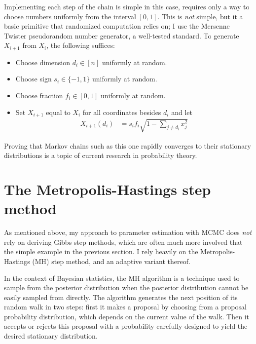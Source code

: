 Implementing each step of the chain is simple in this case, requires
only a way to choose numbers uniformly from the interval $[0,1]$.  This
is \emph{not} simple, but it a basic primitive that randomized
computation relies on; I use the Mersenne Twister pseudorandom number
generator, a well-tested standard.\cite{matsumoto_mersenne_1998}
To generate $X_{i+1}$ from $X_i$, the following suffices:
\begin{itemize}
\item Choose dimension $d_i \in [n]$ uniformly at random.
\item Choose sign $s_i \in \{-1, 1\}$ uniformly at random.
\item Choose fraction $f_i \in [0,1]$ uniformly at random.
\item Set $X_{i+1}$ equal to $X_i$ for all coordinates besides $d_i$ and let
\begin{align*}
X_{i+1}(d_i) &= s_i f_i \sqrt{1 - \sum_{j\neq d_i} x_j^2}
\end{align*}
\end{itemize}

Proving that Markov chains such as this one rapidly converges to their stationary
distributions is a topic of current research in probability theory.

\section{The Metropolis-Hastings step method}
As mentioned above, my approach to parameter estimation with MCMC does
\emph{not} rely on deriving Gibbs step methods, which are often much
more involved that the simple example in the previous section.  I rely
heavily on the Metropolis-Hastings (MH) step method, and an adaptive
variant thereof.\cite{metropolis_equation_1953,hastings_monte__1970,chib_understanding_1995}

In the context of Bayesian statistics, the MH
algorithm is a technique used to sample from the posterior
distribution when the posterior distribution cannot be easily sampled
from directly. The algorithm generates the next position of its random walk
in two steps: first it makes a proposal by choosing from a proposal
probability distribution, which depends on the current value of the
walk. Then it accepts or rejects this proposal with a probability
carefully designed to yield the desired stationary distribution.


